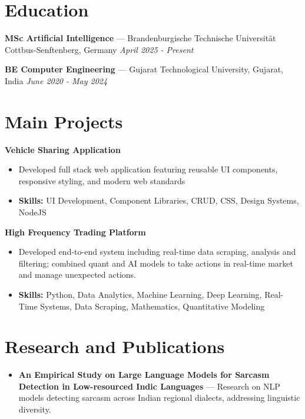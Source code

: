 \documentclass[a4paper,10pt]{article}
\begin{document}
\section*{Education}
\textbf{MSc Artificial Intelligence} — Brandenburgische Technische Universität Cottbus-Senftenberg, Germany \hfill \textit{April 2025 - Present}\par
\vspace{1.5pt}
\textbf{BE Computer Engineering} — Gujarat Technological University, Gujarat, India \hfill \textit{June 2020 - May 2024}\par

\section*{Main Projects}
\textbf{Vehicle Sharing Application}\par
\vspace{1pt}
\begin{itemize}
  \item Developed full stack web application featuring reusable UI components, responsive styling, and modern web standards
  \item \textbf{Skills:} UI Development, Component Libraries, CRUD, CSS, Design Systems, NodeJS
\end{itemize}
\vspace{3pt}
\textbf{High Frequency Trading Platform}\par
\vspace{1pt}
\begin{itemize}
  \item Developed end-to-end system including real-time data scraping, analysis and filtering; combined quant and AI models to take actions in real-time market and manage unexpected actions.
  \item \textbf{Skills:} Python, Data Analytics, Machine Learning, Deep Learning, Real-Time Systems, Data Scraping, Mathematics, Quantitative Modeling
\end{itemize}

\section*{Research and Publications}
\begin{itemize}
\item \textbf{An Empirical Study on Large Language Models for Sarcasm Detection in Low-resourced Indic Languages} — Research on NLP models detecting sarcasm across Indian regional dialects, addressing linguistic diversity.
\end{itemize}
\end{document}
